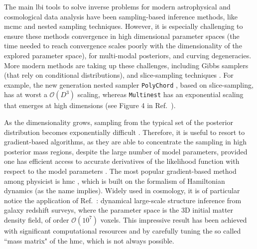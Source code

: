 The main \gls*{lbi} tools to solve inverse problems for modern astrophysical and cosmological data analysis have been sampling-based inference methods, like \gls*{mcmc} \citep{Metropolis:1953am, Hastings:1970aa} and nested sampling \citep{Skilling:2006gxv, Feroz:2008xx, Ashton:2022grj} techniques. However, it is especially challenging to ensure these methods convergence in high dimensional parameter spaces (the time needed to reach convergence scales poorly with the dimensionality of the explored parameter space), for multi-modal posteriors, and curving degeneracies. More modern methods are taking up these challenges, including Gibbs samplers \cite{Smith:1993gibbs} (that rely on conditional distributions), and slice-sampling techniques \cite{Neal:aa, Handley:2015fda}. For example, the new generation nested sampler \texttt{PolyChord} \cite{Handley:2015fda}, based on slice-sampling, has at worst a $\mathcal{O}(D^3)$ scaling, whereas \texttt{Multinest} \cite{Feroz:2008xx} has an exponential scaling that emerges at high dimensions (see Figure 4 in Ref.~\cite{Handley:2015fda}).

As the dimensionality grows, sampling from the typical set of the posterior distribution becomes exponentially difficult \cite{betancourt2017conceptual}. Therefore, it is useful to resort to gradient-based algorithms, as they are able to concentrate the sampling in high posterior mass regions, despite the large number of model parameters, provided one has efficient access to accurate derivatives of the likelihood function with respect to the model parameters \cite{betancourt2017conceptual}. The most popular gradient-based method among physicist is \gls*{hmc} \cite{Duane:1987hmc, neal2012mcmc}, which is built on the formalism of Hamiltonian dynamics (as the name implies). Widely used in cosmology, it is of particular notice the application of Ref.~\cite{Jasche:2012kq}: dynamical large-scale structure inference from galaxy redshift surveys, where the parameter space is the 3D initial matter density field, of order $\mathcal{O}(10^7)$ voxels. This impressive result has been achieved with significant computational resources and by carefully tuning the so called ``mass matrix" of the \gls*{hmc}, which is not always possible. 

